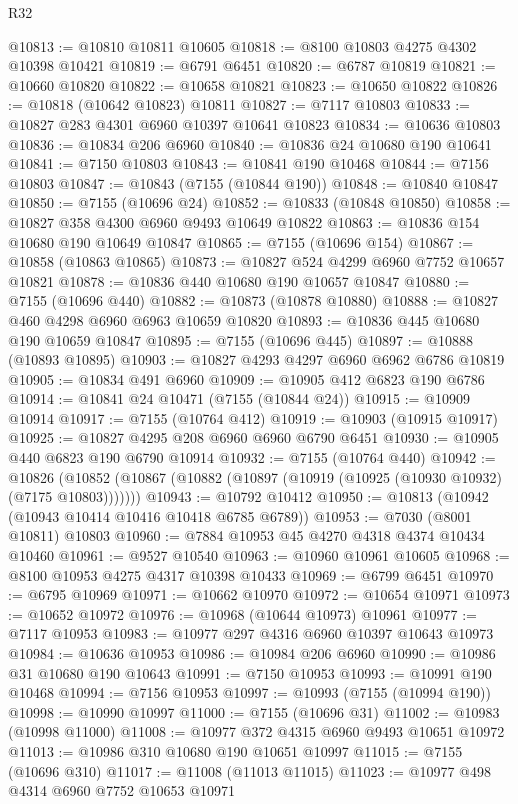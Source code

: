 \begin{lexlean}{R32}
\begin{coremodule}
@10813 := @10810 @10811 @10605
@10818 := @8100 @10803 @4275 @4302 @10398 @10421
@10819 := @6791 @6451
@10820 := @6787 @10819
@10821 := @10660 @10820
@10822 := @10658 @10821
@10823 := @10650 @10822
@10826 := @10818 (@10642 @10823) @10811
@10827 := @7117 @10803
@10833 := @10827 @283 @4301 @6960 @10397 @10641 @10823
@10834 := @10636 @10803
@10836 := @10834 @206 @6960
@10840 := @10836 @24 @10680 @190 @10641
@10841 := @7150 @10803
@10843 := @10841 @190 @10468
@10844 := @7156 @10803
@10847 := @10843 (@7155 (@10844 @190))
@10848 := @10840 @10847
@10850 := @7155 (@10696 @24)
@10852 := @10833 (@10848 @10850)
@10858 := @10827 @358 @4300 @6960 @9493 @10649 @10822
@10863 := @10836 @154 @10680 @190 @10649 @10847
@10865 := @7155 (@10696 @154)
@10867 := @10858 (@10863 @10865)
@10873 := @10827 @524 @4299 @6960 @7752 @10657 @10821
@10878 := @10836 @440 @10680 @190 @10657 @10847
@10880 := @7155 (@10696 @440)
@10882 := @10873 (@10878 @10880)
@10888 := @10827 @460 @4298 @6960 @6963 @10659 @10820
@10893 := @10836 @445 @10680 @190 @10659 @10847
@10895 := @7155 (@10696 @445)
@10897 := @10888 (@10893 @10895)
@10903 := @10827 @4293 @4297 @6960 @6962 @6786 @10819
@10905 := @10834 @491 @6960
@10909 := @10905 @412 @6823 @190 @6786
@10914 := @10841 @24 @10471 (@7155 (@10844 @24))
@10915 := @10909 @10914
@10917 := @7155 (@10764 @412)
@10919 := @10903 (@10915 @10917)
@10925 := @10827 @4295 @208 @6960 @6960 @6790 @6451
@10930 := @10905 @440 @6823 @190 @6790 @10914
@10932 := @7155 (@10764 @440)
@10942 := @10826
    (@10852 (@10867 (@10882 (@10897 (@10919 (@10925 (@10930 @10932) (@7175 @10803)))))))
@10943 := @10792 @10412
@10950 := @10813 (@10942 (@10943 @10414 @10416 @10418 @6785 @6789))
@10953 := @7030 (@8001 @10811) @10803
@10960 := @7884 @10953 @45 @4270 @4318 @4374 @10434 @10460
@10961 := @9527 @10540
@10963 := @10960 @10961 @10605
@10968 := @8100 @10953 @4275 @4317 @10398 @10433
@10969 := @6799 @6451
@10970 := @6795 @10969
@10971 := @10662 @10970
@10972 := @10654 @10971
@10973 := @10652 @10972
@10976 := @10968 (@10644 @10973) @10961
@10977 := @7117 @10953
@10983 := @10977 @297 @4316 @6960 @10397 @10643 @10973
@10984 := @10636 @10953
@10986 := @10984 @206 @6960
@10990 := @10986 @31 @10680 @190 @10643
@10991 := @7150 @10953
@10993 := @10991 @190 @10468
@10994 := @7156 @10953
@10997 := @10993 (@7155 (@10994 @190))
@10998 := @10990 @10997
@11000 := @7155 (@10696 @31)
@11002 := @10983 (@10998 @11000)
@11008 := @10977 @372 @4315 @6960 @9493 @10651 @10972
@11013 := @10986 @310 @10680 @190 @10651 @10997
@11015 := @7155 (@10696 @310)
@11017 := @11008 (@11013 @11015)
@11023 := @10977 @498 @4314 @6960 @7752 @10653 @10971

\end{coremodule}
\end{lexlean}
